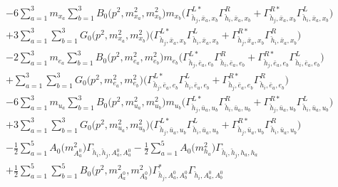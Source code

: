 \begin{itemize}
\begin{align}
 &-6 \sum_{a=1}^{3}m_{x_{{a}}} \sum_{b=1}^{3}{B_0\Big(p^{2},m^2_{x_{{a}}},m^2_{x_{{b}}}\Big)} m_{x_{{b}}} \Big({\Gamma^{L*}_{\check{h}_{{j}},\bar{x}_{{a}},x_{{b}}}} {\Gamma^R_{\check{h}_{{i}},\bar{x}_{{a}},x_{{b}}}}  + {\Gamma^{R*}_{\check{h}_{{j}},\bar{x}_{{a}},x_{{b}}}} {\Gamma^L_{\check{h}_{{i}},\bar{x}_{{a}},x_{{b}}}} \Big)  \nonumber \\ 
 &+3 \sum_{a=1}^{3}\sum_{b=1}^{3}{G_0\Big(p^{2},m^2_{x_{{a}}},m^2_{x_{{b}}}\Big)} \Big({\Gamma^{L*}_{\check{h}_{{j}},\bar{x}_{{a}},x_{{b}}}} {\Gamma^L_{\check{h}_{{i}},\bar{x}_{{a}},x_{{b}}}}  + {\Gamma^{R*}_{\check{h}_{{j}},\bar{x}_{{a}},x_{{b}}}} {\Gamma^R_{\check{h}_{{i}},\bar{x}_{{a}},x_{{b}}}} \Big) \nonumber \\ 
 &-2 \sum_{a=1}^{3}m_{e_{{a}}} \sum_{b=1}^{3}{B_0\Big(p^{2},m^2_{e_{{a}}},m^2_{e_{{b}}}\Big)} m_{e_{{b}}} \Big({\Gamma^{L*}_{\check{h}_{{j}},\bar{e}_{{a}},e_{{b}}}} {\Gamma^R_{\check{h}_{{i}},\bar{e}_{{a}},e_{{b}}}}  + {\Gamma^{R*}_{\check{h}_{{j}},\bar{e}_{{a}},e_{{b}}}} {\Gamma^L_{\check{h}_{{i}},\bar{e}_{{a}},e_{{b}}}} \Big)  \nonumber \\ 
 &+\sum_{a=1}^{3}\sum_{b=1}^{3}{G_0\Big(p^{2},m^2_{e_{{a}}},m^2_{e_{{b}}}\Big)} \Big({\Gamma^{L*}_{\check{h}_{{j}},\bar{e}_{{a}},e_{{b}}}} {\Gamma^L_{\check{h}_{{i}},\bar{e}_{{a}},e_{{b}}}}  + {\Gamma^{R*}_{\check{h}_{{j}},\bar{e}_{{a}},e_{{b}}}} {\Gamma^R_{\check{h}_{{i}},\bar{e}_{{a}},e_{{b}}}} \Big)\nonumber \\ 
 &-6 \sum_{a=1}^{3}m_{u_{{a}}} \sum_{b=1}^{3}{B_0\Big(p^{2},m^2_{u_{{a}}},m^2_{u_{{b}}}\Big)} m_{u_{{b}}} \Big({\Gamma^{L*}_{\check{h}_{{j}},\bar{u}_{{a}},u_{{b}}}} {\Gamma^R_{\check{h}_{{i}},\bar{u}_{{a}},u_{{b}}}}  + {\Gamma^{R*}_{\check{h}_{{j}},\bar{u}_{{a}},u_{{b}}}} {\Gamma^L_{\check{h}_{{i}},\bar{u}_{{a}},u_{{b}}}} \Big)  \nonumber \\ 
 &+3 \sum_{a=1}^{3}\sum_{b=1}^{3}{G_0\Big(p^{2},m^2_{u_{{a}}},m^2_{u_{{b}}}\Big)} \Big({\Gamma^{L*}_{\check{h}_{{j}},\bar{u}_{{a}},u_{{b}}}} {\Gamma^L_{\check{h}_{{i}},\bar{u}_{{a}},u_{{b}}}}  + {\Gamma^{R*}_{\check{h}_{{j}},\bar{u}_{{a}},u_{{b}}}} {\Gamma^R_{\check{h}_{{i}},\bar{u}_{{a}},u_{{b}}}} \Big) \nonumber \\ 
 &-\frac{1}{2} \sum_{a=1}^{5}{A_0\Big(m^2_{A^0_{{a}}}\Big)} {\Gamma_{\check{h}_{{i}},\check{h}_{{j}},A^0_{{a}},A^0_{{a}}}}  -\frac{1}{2} \sum_{a=1}^{5}{A_0\Big(m^2_{h_{{a}}}\Big)} {\Gamma_{\check{h}_{{i}},\check{h}_{{j}},h_{{a}},h_{{a}}}}  \nonumber \\ 
 &+\frac{1}{2} \sum_{a=1}^{5}\sum_{b=1}^{5}{B_0\Big(p^{2},m^2_{A^0_{{a}}},m^2_{A^0_{{b}}}\Big)} {\Gamma^*_{\check{h}_{{j}},A^0_{{a}},A^0_{{b}}}} {\Gamma_{\check{h}_{{i}},A^0_{{a}},A^0_{{b}}}}  \nonumber \\ 

\end{align}
\end{itemize}
